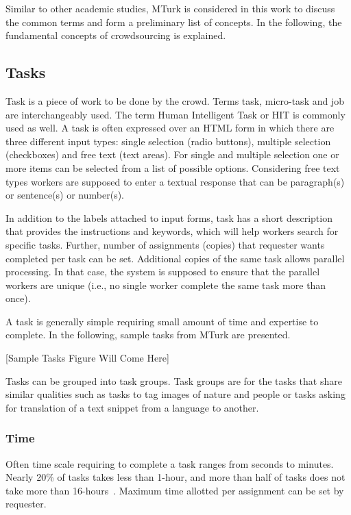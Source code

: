 Similar to other academic studies, MTurk is considered in this work to discuss 
the common terms and form a preliminary list of concepts. In the following, 
the fundamental concepts of crowdsourcing is explained.


\subsection{Tasks}
Task is a piece of work to be done by the crowd. Terms task, micro-task and job 
are interchangeably used. The term Human Intelligent Task or HIT is commonly 
used as well. A task is often expressed over an HTML form in which there are three 
different input types: single selection (radio buttons), multiple selection (checkboxes) 
and free text (text areas). For single and multiple selection one or more items can be 
selected from a list of possible options. Considering free text types workers are 
supposed to enter a textual response that can be paragraph(s) or sentence(s) 
or number(s).

In addition to the labels attached to input forms, task has a short description 
that provides the instructions and keywords, which will help workers search for 
specific tasks. Further, number of assignments (copies) that requester wants completed 
per task can be set. Additional copies of the same task allows parallel processing. 
In that case, the system is supposed to ensure that the parallel workers are unique 
(i.e., no single worker complete the same task more than once).

A task is generally simple requiring small amount of time and expertise to complete. 
In the following, sample tasks from MTurk are presented.

[Sample Tasks Figure Will Come Here]

Tasks can be grouped into task groups. Task groups are for the tasks that share 
similar qualities such as tasks to tag images of nature and people or tasks asking
for translation of a text snippet from a language to another.

\subsubsection{Time}
Often time scale requiring to complete a task ranges from seconds to minutes. 
Nearly 20\% of tasks takes less than 1-hour, and more than half of tasks does not 
take more than 16-hours~\cite{Ipeirotis2010}. Maximum time allotted per 
assignment can be set by requester. 

